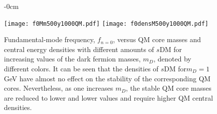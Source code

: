 \documentclass[universe,article,accept,moreauthors,pdftex]{Definitions/mdpi}
\begin{document}
\begin{figure}[H]\ContinuedFloat


\begin{adjustwidth}{-\extralength}{0cm}
\centering %

{\texttt{[image: f0Mm500y1000QM.pdf]}\vspace{3pt}
	  \texttt{[image: f0densM500y1000QM.pdf]}}
\end{adjustwidth}
\caption{Fundamental-mode frequency, $f_{n=0}$, versus QM core masses and central energy densities with different amounts of $s$DM for increasing values of the dark fermion masses, $m_{D}$, denoted by different colors. It can be seen that the densities of $s$DM for$m_{D}=1$ GeV have almost no effect on the stability of the corresponding QM cores. Nevertheless, as one increases $m_{D}$, the stable QM core masses are reduced to lower and lower values and require higher QM central densities. }
\label{fig:f0Mdens1000QM}%

\end{figure}
\end{document}

